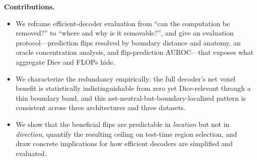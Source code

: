 \smallskip\noindent\textbf{Contributions.}
\begin{itemize}\setlength\itemsep{2pt}
  \item We reframe efficient-decoder evaluation from ``can the computation be removed?''
  to ``where and why is it removable?'', and give an evaluation protocol---prediction
  flips resolved by boundary distance and anatomy, an oracle concentration analysis, and
  flip-prediction AUROC---that exposes what aggregate Dice and FLOPs hide.
  \item We characterize the redundancy empirically: the full decoder's net voxel benefit
  is statistically indistinguishable from zero yet Dice-relevant through a thin boundary
  band, and this net-neutral-but-boundary-localized pattern is consistent across three
  architectures and three datasets.
  \item We show that the beneficial flips are predictable in \emph{location} but not in
  \emph{direction}, quantify the resulting ceiling on test-time region selection, and draw
  concrete implications for how efficient decoders are simplified and evaluated.
\end{itemize}
